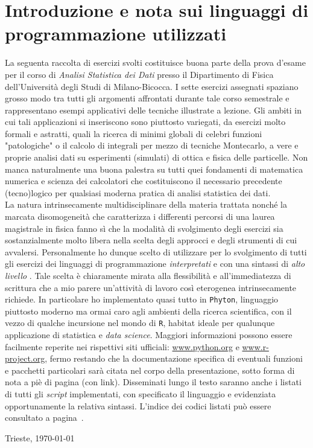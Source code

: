 \section{Introduzione e nota sui linguaggi di programmazione utilizzati}

La seguenta raccolta di esercizi svolti costituisce buona parte della prova d'esame per il corso di \emph{Analisi Statistica dei Dati} presso il Dipartimento di Fisica dell'Università degli Studi di Milano-Bicocca. I sette esercizi assegnati spaziano grosso modo tra tutti gli argomenti affrontati durante tale corso semestrale e rappresentano esempi applicativi delle tecniche illustrate a lezione. Gli ambiti in cui tali applicazioni si inseriscono sono piuttosto variegati, da esercizi molto formali e astratti, quali la ricerca di minimi globali di celebri funzioni "patologiche" o il calcolo di integrali per mezzo di tecniche Montecarlo, a vere e proprie analisi dati su esperimenti (simulati) di ottica e fisica delle particelle. Non manca naturalmente una buona palestra su tutti quei fondamenti di matematica numerica e scienza dei calcolatori che costituiscono il necessario precedente (tecno)logico per qualsiasi moderna pratica di analisi statistica dei dati.\\

\noindent La natura intrinsecamente multidisciplinare della materia trattata nonché la marcata disomogeneità che caratterizza i differenti percorsi di una laurea magistrale in fisica fanno sì che la modalità di svolgimento degli esercizi sia sostanzialmente molto libera nella scelta degli approcci e degli strumenti di cui avvalersi. Personalmente ho dunque scelto di utilizzare per lo svolgimento di tutti gli esercizi dei linguaggi di programmazione \emph{interpretati} e con una sintassi di \emph{alto livello} . Tale scelta è chiaramente mirata alla flessibilità e all'immediatezza di scrittura che a mio parere un'attività di lavoro così eterogenea intrinsecamente richiede.  In particolare ho implementato quasi tutto in \texttt{Phyton}, linguaggio piuttosto moderno ma ormai caro agli ambienti della ricerca scientifica, con il vezzo di qualche incursione nel mondo di \texttt{R}, habitat ideale per qualunque applicazione di statistica e \emph{data science}. Maggiori informazioni possono essere facilmente reperite nei rispettivi siti ufficiali: \url{www.python.org} e \url{www.r-project.org}, fermo restando che la documentazione specifica di eventuali funzioni e pacchetti particolari sarà citata nel corpo della presentazione, sotto forma di nota a piè di pagina (con link). Disseminati lungo il testo saranno anche i listati di tutti gli \emph{script} implementati, con specificato il linguaggio e evidenziata opportunamente la relativa sintassi. L'indice dei codici listati può essere consultato a pagina~\pageref{listoflistings}.\\

\bigskip

\noindent Trieste, \today\\

\newpage